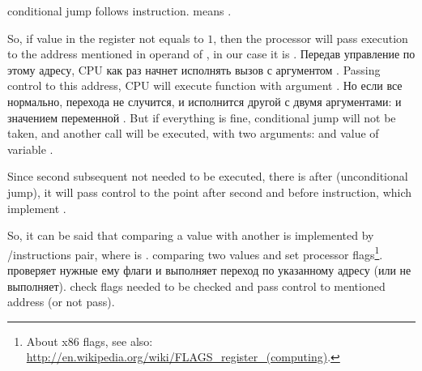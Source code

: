 {\JNE conditional jump follows \CMP instruction. \JNE means .}

{So, if value in the \EAX register not equals to $1$, then the processor will pass execution to the 
address mentioned in operand of \JNE, in our case it is .}
\IFRU
{Передав управление по этому адресу, \ac{CPU} как раз начнет исполнять вызов \printf с 
аргументом .}
{Passing control to this address, \ac{CPU} will execute function \printf 
with argument .}
\IFRU
{Но если все нормально, перехода не случится, и исполнится другой \printf с двумя аргументами: 
 и значением переменной .}
{But if everything is fine, conditional jump will not be taken, and another \printf call 
will be executed, with two arguments:  and value of variable . }

{Since second subsequent \printf not needed to be executed, there is \JMP after (unconditional jump),
it will pass control to the point after second \printf and before  instruction, 
which implement .}

{So, it can be said that comparing a value with another is  implemented
by \CMP/\Jcc instructions pair, where  is .}
{\CMP comparing two values and set 
processor flags\footnote{About x86 flags, see also: \url{http://en.wikipedia.org/wiki/FLAGS_register_(computing)}.}.}
\IFRU
{\Jcc проверяет нужные ему флаги и выполняет переход по указанному адресу (или не выполняет).}
{\Jcc check flags needed to be checked and pass control to mentioned address (or not pass).}

